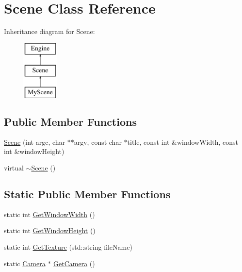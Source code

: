 \hypertarget{class_scene}{}\section{Scene Class Reference}
\label{class_scene}
Inheritance diagram for Scene\+:\begin{figure}[H]
\begin{center}
\leavevmode
\includegraphics[height=3.000000cm]{class_scene}
\end{center}
\end{figure}
\subsection*{Public Member Functions}
\begin{DoxyCompactItemize}
\item 
\hyperlink{class_scene_a75a2d7229276dfb590272846083cc64d}{Scene} (int argc, char $\ast$$\ast$argv, const char $\ast$title, const int \&window\+Width, const int \&window\+Height)
\item 
virtual \hyperlink{class_scene_a3b8cec2e32546713915f8c6303c951f1}{$\sim$\+Scene} ()
\end{DoxyCompactItemize}
\subsection*{Static Public Member Functions}
\begin{DoxyCompactItemize}
\item 
static int \hyperlink{class_scene_ac311bf97401b0d26e6df07efed35d355}{Get\+Window\+Width} ()
\item 
static int \hyperlink{class_scene_a178707699459f782a39ed7f6508ccd41}{Get\+Window\+Height} ()
\item 
static int \hyperlink{class_scene_ad2ff858bbd74d760d543bb29ca8c8153}{Get\+Texture} (std\+::string file\+Name)
\item 
static \hyperlink{class_camera}{Camera} $\ast$ \hyperlink{class_scene_aa08b6b22037aa939e6e6fe732765bc66}{Get\+Camera} ()
\end{DoxyCompactItemize}
